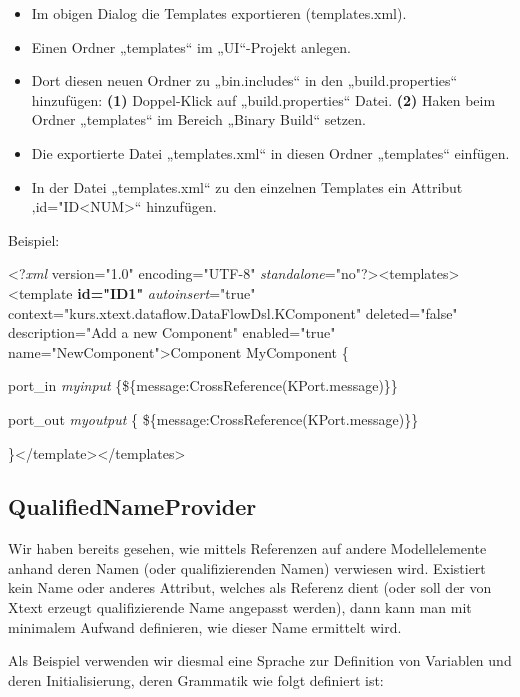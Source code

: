 \documentclass[]{article}
\providecommand{\tightlist}{%
  \setlength{\itemsep}{0pt}\setlength{\parskip}{0pt}}
\begin{document}
\begin{itemize}
\tightlist
\item
  Im obigen Dialog die Templates exportieren (templates.xml).
\item
  Einen Ordner „templates`` im „UI``-Projekt anlegen.
\item
  Dort diesen neuen Ordner zu „bin.includes`` in den „build.properties``
  hinzufügen: \textbf{(1) }Doppel-Klick auf „build.properties`` Datei.
  \textbf{(2) }Haken beim Ordner „templates`` im Bereich „Binary Build``
  setzen.
\item
  Die exportierte Datei „templates.xml`` in diesen Ordner „templates``
  einfügen.
\item
  In der Datei „templates.xml`` zu den einzelnen Templates ein Attribut
  ‚id="ID\textless{}NUM\textgreater{}`` hinzufügen. 
\end{itemize}

Beispiel:

\textless{}?\emph{xml} version="1.0" encoding="UTF-8"
\emph{standalone}="no"?\textgreater{}\textless{}templates\textgreater{}\textless{}template
\textbf{id="ID1"} \emph{autoinsert}="true"
context="kurs.xtext.dataflow.DataFlowDsl.KComponent" deleted="false"
description="Add a new Component" enabled="true"
name="NewComponent"\textgreater{}Component MyComponent \{

port\_in \emph{myinput} \{\$\{message:CrossReference(KPort.message)\}\}

port\_out \emph{myoutput} \{
\$\{message:CrossReference(KPort.message)\}\}

\}\textless{}/template\textgreater{}\textless{}/templates\textgreater{}

\subsection[QualifiedNameProvider]{\texorpdfstring{\protect\hypertarget{anchor-54}{}{}QualifiedNameProvider}{QualifiedNameProvider}}\label{qualifiednameprovider}

Wir haben bereits gesehen, wie mittels Referenzen auf andere
Modellelemente anhand deren Namen (oder qualifizierenden Namen)
verwiesen wird. Existiert kein Name oder anderes Attribut, welches als
Referenz dient (oder soll der von Xtext erzeugt qualifizierende Name
angepasst werden), dann kann man mit minimalem Aufwand definieren, wie
dieser Name ermittelt wird.

Als Beispiel verwenden wir diesmal eine Sprache zur Definition von
Variablen und deren Initialisierung, deren Grammatik wie folgt definiert
ist:
\end{document}
